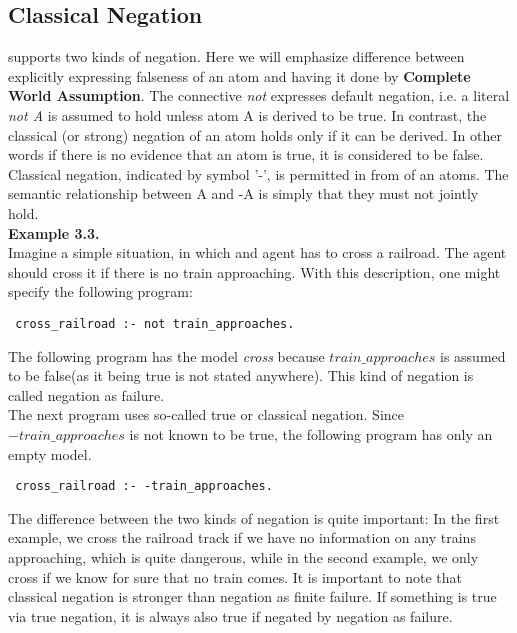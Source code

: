 \documentclass[14pt,a4paper, titlepage]{article}
\begin{document}
\subsection{Classical Negation}
\dlvhex{} supports two kinds of negation. Here we will emphasize difference between explicitly expressing falseness of an atom and having it done by \textbf{Complete World Assumption}. The connective \textit{not} expresses default negation, i.e. a literal \textit{not A} is assumed to hold unless atom A is derived to be true. In contrast, the classical (or strong) negation of an atom holds only if it can be derived. In other words if there is no evidence that an atom is true, it is considered to be false. Classical negation, indicated by symbol '-', is permitted in from of an atoms. The semantic relationship between A and -A is simply that they must not jointly hold. 
\\ \textbf{Example 3.3.}
\\ Imagine a simple situation, in which and agent has to cross a railroad. The agent should cross it if there is no train approaching. With this description, one might specify the following program:
\begin{lstlisting}
 cross_railroad :- not train_approaches.
\end{lstlisting}
The following program has the model \textit{cross} because $train\_approaches$ is assumed to be false(as it being true is not stated anywhere). This kind of negation is called negation as failure.\\The next program uses so-called true or classical negation. Since \textit{$-train\_approaches$} is not known to be true, the following program has only an empty model.
\begin{lstlisting}
 cross_railroad :- -train_approaches.
\end{lstlisting}
The difference between the two kinds of negation is quite important: In the first example, we cross the railroad track if we have no information on any trains approaching, which is quite dangerous, while in the second example, we only cross if we know for sure that no train comes. It is important to note that classical negation is stronger than negation as finite failure. If something is true via true negation, it is always also true if negated by negation as failure.
\end{document}
